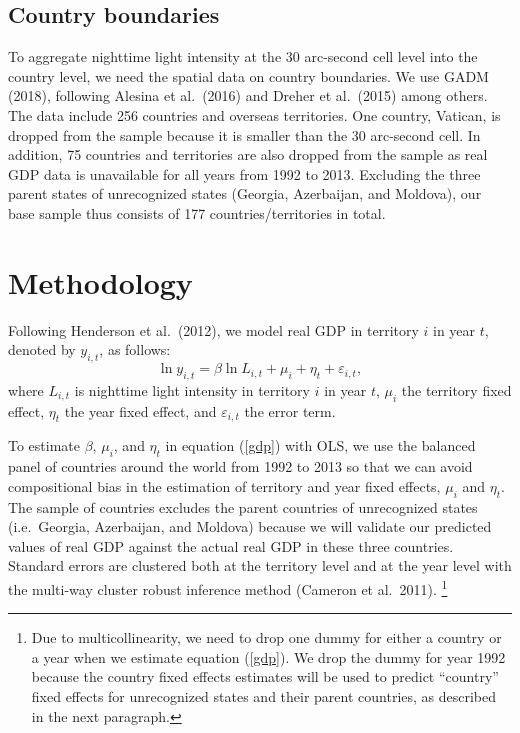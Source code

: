 \documentclass[12pt,a4paper]{article}%
\begin{document}
\subsection{Country boundaries}
To aggregate nighttime light intensity at the 30 arc-second cell level into the country level, we need the spatial data on country boundaries. 
We use GADM (2018), following Alesina et al.\ (2016) and Dreher et al.\ (2015) among others. 
The data include 256 countries and overseas territories. 
One country, Vatican, is dropped from the sample because it is smaller than the 30 arc-second cell. 
In addition, 75 countries and territories are also dropped from the sample as real GDP data is unavailable for all years from 1992 to 2013.
Excluding the three parent states of unrecognized states (Georgia, Azerbaijan, and Moldova), our base sample thus consists of 177 countries/territories in total.
\section{Methodology}
Following Henderson et al.\ (2012), we model real GDP in territory $i$ in year $t$, denoted by $y_{i,t}$, as follows:
\begin{equation}\label{gdp}
\ln y_{i,t} = \beta \ln L_{i,t} + \mu_i + \eta_t + \varepsilon_{i,t},
\end{equation}
where $L_{i,t}$ is nighttime light intensity in territory $i$ in year $t$, $\mu_i$ the territory fixed effect, $\eta_t$ the year fixed effect, and $\varepsilon_{i,t}$ the error term.

To estimate $\beta$, $\mu_i$, and $\eta_t$ in equation (\ref{gdp}) with OLS, we use the balanced panel of countries around the world from 1992 to 2013 so that we can avoid compositional bias in the estimation of territory and year fixed effects, $\mu_i$ and $\eta_t$. 
The sample of countries excludes the parent countries of unrecognized states (i.e.\ Georgia, Azerbaijan, and Moldova) because we will validate our predicted values of real GDP against the actual real GDP in these three countries.
Standard errors are clustered both at the territory level and at the year level with the multi-way cluster robust inference method (Cameron et al.\ 2011).%
\footnote{Due to multicollinearity, we need to drop one dummy for either a country or a year when we estimate equation (\ref{gdp}). We drop the dummy for year 1992 because the country fixed effects estimates will be used to predict ``country'' fixed effects for unrecognized states and their parent countries, as described in the next paragraph.}
\end{document}
